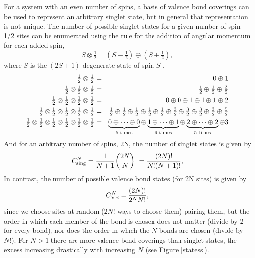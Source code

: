 For a system with an even number of spins, a basis of valence bond coverings can be used to represent an arbitrary singlet state, 
 but in general that representation is not unique.
The number of possible singlet states for a given number of spin-1/2 sites can be enumerated
using the rule for the addition of angular momentum for each added spin,
\begin{equation}
	S\otimes \tfrac{1}{2}  = \left(S-\tfrac{1}{2}\right)\oplus\left(S+\tfrac{1}{2}\right),
\end{equation}
where $S$ is the $(2S+1)$-degenerate state of spin $S$ \cite{Beach2006}.
\begin{eqnarray}
	\tfrac{1}{2} \otimes \tfrac{1}{2}  &=& 0 \oplus 1\nonumber \\ 
	\tfrac{1}{2} \otimes \tfrac{1}{2}  \otimes \tfrac{1}{2} &=& 
	\tfrac{1}{2} \oplus  \tfrac{1}{2} \oplus  \tfrac{3}{2} \nonumber \\
	\tfrac{1}{2} \otimes \tfrac{1}{2}  \otimes \tfrac{1}{2} \otimes \tfrac{1}{2} &=& 
	0 \oplus 0 \oplus 1 \oplus 1 \oplus 1 \oplus 2 \nonumber \\
	\tfrac{1}{2} \otimes \tfrac{1}{2}  \otimes \tfrac{1}{2}  \otimes \tfrac{1}{2}  \otimes \tfrac{1}{2}&=& 
	\tfrac{1}{2} \oplus \tfrac{1}{2} \oplus \tfrac{1}{2} \oplus \tfrac{1}{2} \oplus \tfrac{1}{2} \oplus  
	\tfrac{3}{2} \oplus \tfrac{3}{2} \oplus \tfrac{3}{2} \oplus \tfrac{3}{2} \oplus
	  \tfrac{5}{2} \nonumber \\
	\tfrac{1}{2} \otimes \tfrac{1}{2}  \otimes \tfrac{1}{2} \otimes \tfrac{1}{2} \otimes \tfrac{1}{2}
	\otimes \tfrac{1}{2} &=& 
	\underbrace{0 \oplus\cdots \oplus 0}_{5 \rm{\; times}} \oplus 
	\underbrace{1 \oplus \cdots \oplus 1}_{9 \rm{\; times}} \oplus 
	\underbrace{2 \oplus \cdots \oplus 2}_{5 \rm{\; times}} 
	\oplus 3 \nonumber
\end{eqnarray}
And for an arbitrary number of spins, 2N, the number of singlet states is given by \cite{Beach2006}
\begin{equation}
	C_{\rm{sing}}^N = \frac{1}{N+1}\binom{2N}{N}\ = \frac{(2N)!}{N!(N+1)!},
\end{equation}  
In contrast, the number of possible valence bond states (for 2N sites) is given by
\begin{equation}
	C_{\rm{VB}}^N =
	\frac{(2N)!}{2^NN!},
\end{equation}
since we choose sites at random ($2N!$ ways to choose them) pairing them, but the order 
in which each member of the bond is chosen does not matter (divide by 2 for every bond), 
nor does the order in which the $N$ bonds are chosen (divide by $N!$).
For $N>1$ there are more valence bond coverings than singlet states, the excess increasing 
drastically with increasing $N$ (see Figure \ref{statess}).  

